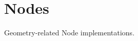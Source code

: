 \hypertarget{group___geometry_nodes}{}\section{Nodes}
\label{group___geometry_nodes}
Geometry-\/related Node implementations. 

